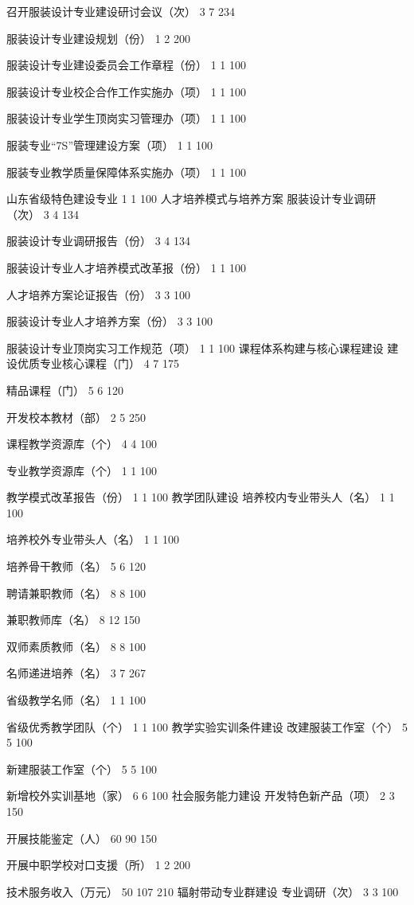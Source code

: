 召开服装设计专业建设研讨会议（次）
3
7
234%

服装设计专业建设规划（份）
1
2
200%

服装设计专业建设委员会工作章程（份）
1
1
100%

服装设计专业校企合作工作实施办（项）
1
1
100%

服装设计专业学生顶岗实习管理办（项）
1
1
100%

服装专业“7S”管理建设方案（项）
1
1
100%

服装专业教学质量保障体系实施办（项）
1
1
100%

山东省级特色建设专业
1
1
100%
人才培养模式与培养方案
服装设计专业调研（次）
3
4
134%

服装设计专业调研报告（份）
3
4
134%

服装设计专业人才培养模式改革报（份）
1
1
100%

人才培养方案论证报告（份）
3
3
100%

服装设计专业人才培养方案（份）
3
3
100%

服装设计专业顶岗实习工作规范（项）
1
1
100%
课程体系构建与核心课程建设
建设优质专业核心课程（门）
4
7
175%

精品课程（门）
5
6
120%

开发校本教材（部）
2
5
250%

课程教学资源库（个）
4
4
100%

专业教学资源库（个）
1
1
100%

教学模式改革报告（份）
1
1
100%
教学团队建设
培养校内专业带头人（名）
1
1
100%

培养校外专业带头人（名）
1
1
100%

培养骨干教师（名）
5
6
120%

聘请兼职教师（名）
8
8
100%

兼职教师库（名）
8
12
150%

双师素质教师（名）
8
8
100%

名师递进培养（名）
3
7
267%

省级教学名师（名）
1
1
100%

省级优秀教学团队（个）
1
1
100%
教学实验实训条件建设
改建服装工作室（个）
5
5
100%

新建服装工作室（个）
5
5
100%

新增校外实训基地（家）
6
6
100%
社会服务能力建设
开发特色新产品（项）
2
3
150%

开展技能鉴定（人）
60
90
150%

开展中职学校对口支援（所）
1
2
200%

技术服务收入（万元）
50
107
210%
辐射带动专业群建设
专业调研（次）
3
3
100%

